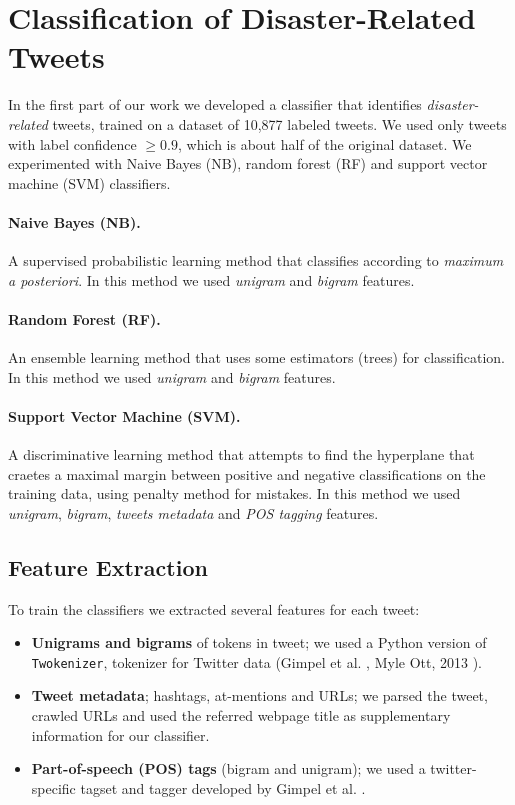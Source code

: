 \documentclass[letterpaper,twocolumn,10pt]{article}
\begin{document}
\section{Classification of Disaster-Related Tweets} \label{mission1}

In the first part of our work we developed a classifier that identifies \textit{disaster-related} tweets,  trained on a dataset of 10,877 labeled tweets. We used only tweets with label confidence $\geq 0.9$, which is about half of the original dataset. We experimented with Naive Bayes (NB), random forest (RF) and support vector machine (SVM) classifiers.

\paragraph{Naive Bayes (NB).}
A supervised probabilistic learning method that classifies according to \textit{maximum a posteriori}. In this method we used \textit{unigram} and \textit{bigram} features.

\paragraph{Random Forest (RF).}
An ensemble learning method that uses some estimators (trees) for classification. In this method we used \textit{unigram} and \textit{bigram} features.

\paragraph{Support Vector Machine (SVM).}
A discriminative learning method that attempts to find the hyperplane that craetes a maximal margin between positive and negative classifications on the training data, using penalty method for mistakes. In this method we used \textit{unigram}, \textit{bigram}, \textit{tweets metadata} and \textit{POS tagging} features.

\subsection{Feature Extraction}

To train the classifiers we extracted several features for each tweet:

\begin{itemize}[noitemsep]
	\item \textbf{Unigrams and bigrams} of tokens in tweet; we used a Python version of \texttt{Twokenizer}, tokenizer for Twitter data (Gimpel et al. \cite{POS-Tagging}, Myle Ott, 2013 \cite{ark-twokenize-py}).
	\item \textbf{Tweet metadata}; hashtags, at-mentions and URLs; we parsed the tweet, crawled URLs and used the referred webpage title as supplementary information for our classifier.
	\item \textbf{Part-of-speech (POS) tags} (bigram and unigram); we used a twitter-specific tagset and tagger developed by Gimpel et al. \cite{POS-Tagging}.
\end{itemize}
\end{document}
